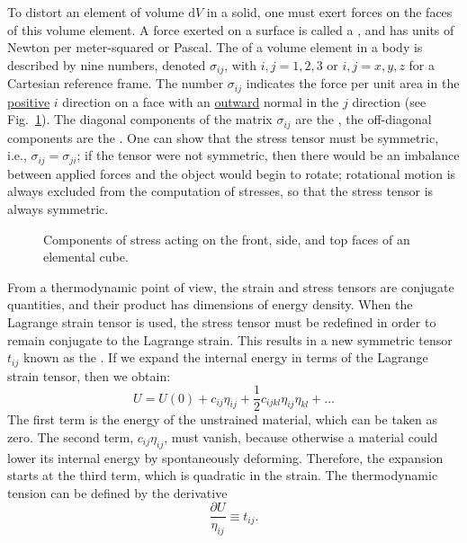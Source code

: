 To distort an element of volume $\mathrm{d}V$ in a solid, one must exert forces on the faces of this volume element.  A force exerted on a surface is called a , and has units of Newton per meter-squared or Pascal.  The  of a volume element in a body is described by nine numbers, denoted $\sigma_{ij}$, with $i,j=1,2,3$ or $i,j=x,y,z$ for a Cartesian reference frame.  The number $\sigma_{ij}$ indicates the force per unit area in the \underline{positive} $i$ direction on a face with an \underline{outward} normal in the $j$ direction (see Fig.~\ref{\chabbr:fig:deformation3}). The diagonal components of the matrix $\sigma_{ij}$ are the , the off-diagonal components are the .  One can show that the stress tensor must be symmetric, i.e., $\sigma_{ij}=\sigma_{ji}$; if the tensor were not symmetric, then there would be an imbalance between applied forces and the object would begin to rotate; rotational motion is always excluded from the computation of stresses, so that the stress tensor is always symmetric.

\begin{figure}[h]
\caption{Components of stress acting on the front, side, and top faces of an elemental cube.}
\label{\chabbr:fig:deformation3}
\end{figure}


From a thermodynamic point of view, the strain and stress tensors are conjugate quantities, and their product has dimensions of energy density.  When the Lagrange strain tensor is used, the stress tensor must be redefined in order to remain conjugate to the Lagrange strain. This results in a new symmetric tensor $t_{ij}$ known as the .  If we expand the internal energy in terms of the Lagrange strain tensor, then we obtain:
\[
	U = U(0) + c_{ij}\eta_{ij} + \frac{1}{2}c_{ijkl}\eta_{ij}\eta_{kl} + \ldots
\]
The first term is the energy of the unstrained material, which can be taken as zero.  The second term, $c_{ij}\eta_{ij}$, must vanish, because otherwise a material could lower its internal energy by spontaneously deforming.  Therefore, the expansion starts at the third term, which is quadratic in the strain. The thermodynamic tension can be defined by the derivative
\[
	\frac{\partial U}{\eta_{ij}} \equiv t_{ij}.
\]




